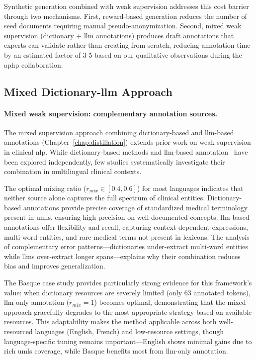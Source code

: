Synthetic generation combined with weak supervision addresses this cost barrier through two mechanisms.
First, reward-based generation reduces the number of seed documents requiring manual pseudo-anonymization.
Second, mixed weak supervision (dictionary + \gls{llm} annotations) produces draft annotations that experts can validate rather than creating from scratch, reducing annotation time by an estimated factor of 3-5 based on our qualitative observations during the \gls{aphp} collaboration.

\subsection{Mixed Dictionary-\gls{llm} Approach}

\paragraph{Mixed weak supervision: complementary annotation sources.}

The mixed supervision approach combining dictionary-based and \gls{llm}-based annotations (Chapter~\ref{chap:distillation}) extends prior work on weak supervision in clinical \gls{nlp}.
While dictionary-based methods and \gls{llm}-based annotation~\cite{Agrawal2022LargeExtractors} have been explored independently, few studies systematically investigate their combination in multilingual clinical contexts.

The optimal mixing ratio ($r_{mix} \in [0.4, 0.6]$) for most languages indicates that neither source alone captures the full spectrum of clinical entities.
Dictionary-based annotations provide precise coverage of standardized medical terminology present in \gls{umls}, ensuring high precision on well-documented concepts.
\gls{llm}-based annotations offer flexibility and recall, capturing context-dependent expressions, multi-word entities, and rare medical terms not present in lexicons.
The analysis of complementary error patterns—dictionaries under-extract multi-word entities while \glspl{llm} over-extract longer spans—explains why their combination reduces bias and improves generalization.

The Basque case study provides particularly strong evidence for this framework's value: when dictionary resources are severely limited (only 63 annotated tokens), \gls{llm}-only annotation ($r_{mix} = 1$) becomes optimal, demonstrating that the mixed approach gracefully degrades to the most appropriate strategy based on available resources.
This adaptability makes the method applicable across both well-resourced languages (English, French) and low-resource settings, though language-specific tuning remains important—English shows minimal gains due to rich \gls{umls} coverage, while Basque benefits most from \gls{llm}-only annotation.

